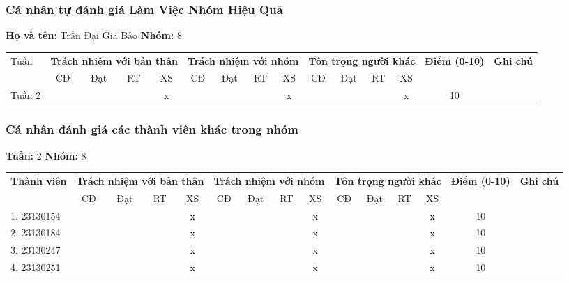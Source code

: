 \subsubsection*{Cá nhân tự đánh giá Làm Việc Nhóm Hiệu Quả}

\noindent \textbf{Họ và tên:} Trần Đại Gia Bảo \hrulefill \quad \textbf{Nhóm:} 8 \hrulefill

\vspace{0.5cm}

\begin{tabularx}{\linewidth}{|X|c|c|c|c|c|c|c|c|c|c|c|c|c|c|}
\hline
Tuần & \multicolumn{4}{c|}{\textbf{Trách nhiệm với bản thân}} & \multicolumn{4}{c|}{\textbf{Trách nhiệm với nhóm}} & \multicolumn{4}{c|}{\textbf{Tôn trọng người khác}} & \multirow{2}{1.5cm}{\textbf{Điểm (0-10)}} & \multirow{2}{1.5cm}{\textbf{Ghi chú}} \\ \cline{2-13}
 & CĐ & Đạt & RT & XS & CĐ & Đạt & RT & XS & CĐ & Đạt & RT & XS & & \\ \hline
  Tuần 2 & & & & x & & & & x & & & & x & 10 & \\ \hline
\end{tabularx}

\vspace{1cm}

\subsubsection*{Cá nhân đánh giá các thành viên khác trong nhóm}

\noindent \textbf{Tuần:} 2 \hrulefill \quad \textbf{Nhóm:} 8 \hrulefill

\vspace{0.5cm}

\begin{tabularx}{\linewidth}{|X|c|c|c|c|c|c|c|c|c|c|c|c|c|c|}
\hline
\multirow{2}{3cm}{\textbf{Thành viên}} & \multicolumn{4}{c|}{\textbf{Trách nhiệm với bản thân}} & \multicolumn{4}{c|}{\textbf{Trách nhiệm với nhóm}} & \multicolumn{4}{c|}{\textbf{Tôn trọng người khác}} & \multirow{2}{1.2cm}{\textbf{Điểm (0-10)}} & \multirow{2}{1.5cm}{\textbf{Ghi chú}} \\ \cline{2-13}
 & CĐ & Đạt & RT & XS & CĐ & Đạt & RT & XS & CĐ & Đạt & RT & XS & & \\ \hline
1. 23130154 & & & & x & & & & x & & & & x & 10 & \\ \hline
2. 23130184 & & & & x & & & & x & & & & x & 10 & \\ \hline
3. 23130247 & & & & x & & & & x & & & & x & 10 & \\ \hline
4. 23130251 & & & & x & & & & x & & & & x & 10 & \\ \hline
\end{tabularx}
